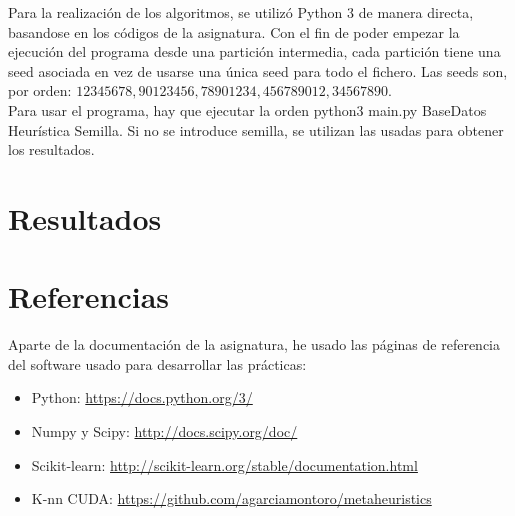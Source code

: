 Para la realización de los algoritmos, se utilizó Python 3 de manera directa, basandose en los códigos de la asignatura. Con el fin de poder empezar la ejecución del programa desde una partición intermedia, cada partición tiene una seed asociada en vez de usarse una única seed para todo el fichero. Las seeds son, por orden: $12345678,90123456,78901234,456789012,34567890$. \\

Para usar el programa, hay que ejecutar la orden  python3 main.py BaseDatos Heurística Semilla. Si no se introduce semilla, se utilizan las usadas para obtener los resultados.
\newpage
\section{Resultados}

\newpage
\section{Referencias}
Aparte de la documentación de la asignatura, he usado las páginas de referencia del software usado para desarrollar las prácticas:
\begin{itemize}
\item Python:  \url{https://docs.python.org/3/}
\item Numpy y Scipy: \url{http://docs.scipy.org/doc/}
\item Scikit-learn: \url{http://scikit-learn.org/stable/documentation.html}
\item K-nn CUDA: \url{https://github.com/agarciamontoro/metaheuristics}
\end{itemize}
